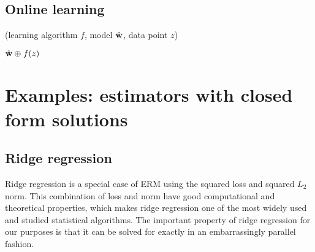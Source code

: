 \documentclass[thesis.tex]{subfiles}
\newcommand{\set}[1]{\mathcal {#1}}
\newcommand{\mappend}[1]{\oplus_{\set {#1}}}
\begin{document}

\subsection{Online learning}

\begin{algorithm}
    \caption{(learning algorithm $f$, model ${\hat{\mathbf w}}$, data point $z$)}
    \vspace{0.1in}
    \begin{algorithmic}[1]
        \State \Return $\what \mappend{} f(z)$
    \end{algorithmic}
\end{algorithm}


\section{Examples: estimators with closed form solutions}


\subsection{Ridge regression}
\label{sec:ridge}



Ridge regression is a special case of ERM using the squared loss and squared $L_2$ norm.
This combination of loss and norm have good computational and theoretical properties,
which makes ridge regression one of the most widely used and studied statistical algorithms.
The important property of ridge regression for our purposes is that it can be solved for exactly in an embarrassingly parallel fashion.
\end{document}
